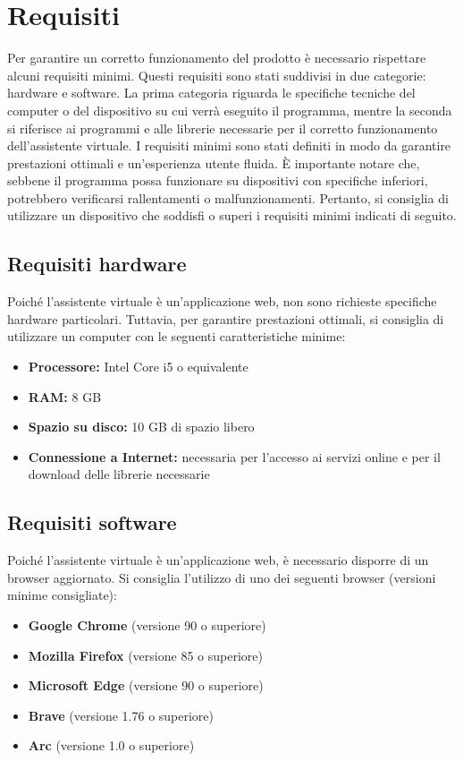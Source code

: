 \section{Requisiti}
Per garantire un corretto funzionamento del prodotto è necessario rispettare alcuni requisiti minimi. Questi requisiti sono stati suddivisi in due categorie: hardware e software. La prima categoria riguarda le specifiche tecniche del computer o del dispositivo su cui verrà eseguito il programma, mentre la seconda si riferisce ai programmi e alle librerie necessarie per il corretto funzionamento dell'assistente virtuale.
I requisiti minimi sono stati definiti in modo da garantire prestazioni ottimali e un'esperienza utente fluida. È importante notare che, sebbene il programma possa funzionare su dispositivi con specifiche inferiori, potrebbero verificarsi rallentamenti o malfunzionamenti. Pertanto, si consiglia di utilizzare un dispositivo che soddisfi o superi i requisiti minimi indicati di seguito.

\subsection{Requisiti hardware}
Poiché l'assistente virtuale è un'applicazione web, non sono richieste specifiche hardware particolari. Tuttavia, per garantire prestazioni ottimali, si consiglia di utilizzare un computer con le seguenti caratteristiche minime:
\begin{itemize}
    \item \textbf{Processore:} Intel Core i5 o equivalente
    \item \textbf{RAM:} 8 GB
    \item \textbf{Spazio su disco:} 10 GB di spazio libero
    \item \textbf{Connessione a Internet:} necessaria per l'accesso ai servizi online e per il download delle librerie necessarie
\end{itemize}

\subsection{Requisiti software}
Poiché l'assistente virtuale è un'applicazione web, è necessario disporre di un browser aggiornato. Si consiglia l'utilizzo di uno dei seguenti browser (versioni minime consigliate):  
\begin{itemize}
    \item \textbf{Google Chrome} (versione 90 o superiore)
    \item \textbf{Mozilla Firefox} (versione 85 o superiore)
    \item \textbf{Microsoft Edge} (versione 90 o superiore)
    \item \textbf{Brave} (versione 1.76 o superiore)
    \item \textbf{Arc} (versione 1.0 o superiore)
\end{itemize}
